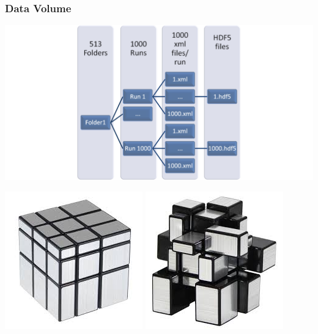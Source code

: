 \documentclass[9pt,sansserif]{beamer}
\begin{document}
\begin{frame}{}\small
\frametitle{Data Volume}

\begin{minipage}{12cm}
%
\begin{minipage}{8cm}
\hspace{-2cm}
\includegraphics[scale=0.5]{./png/set_run_hierarchy.png}
\end{minipage}
%
\begin{minipage}{4cm}
{ \includegraphics[scale=0.4]{./png/rubiks-mirror-cube-regular.jpg}}
%
{ \includegraphics[scale=0.4]{./png/rubiks-mirror-cube-mixed-up.jpg}}
\end{minipage}
%
\end{minipage}

\end{frame}
\end{document}
